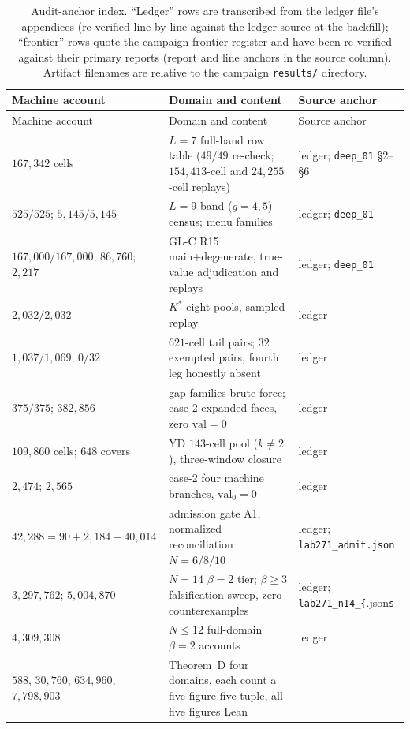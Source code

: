 \begin{longtable}{p{4.9cm} p{6.1cm} p{3.8cm}}
\caption{Audit-anchor index. ``Ledger'' rows are transcribed from the ledger file's
appendices (re-verified line-by-line against the ledger source at the backfill);
``frontier'' rows quote the campaign frontier register and have been re-verified
against their primary reports (report and line anchors in the source column). Artifact
filenames are relative to the campaign \texttt{results/} directory.}
\label{tab:anchorindex}\\
\hline
Machine account & Domain and content & Source anchor \\
\hline
\endfirsthead
\hline
Machine account & Domain and content & Source anchor \\
\hline
\endhead
$167{,}342$ cells & $L=7$ full-band row table ($49/49$ re-check; $154{,}413$-cell and
  $24{,}255$-cell replays) & ledger; \texttt{deep\_01} \S2--\S6 \\
$525/525$; $5{,}145/5{,}145$ & $L=9$ band ($g=4,5$) census; menu families &
  ledger; \texttt{deep\_01} \\
$167{,}000/167{,}000$; $86{,}760$; $2{,}217$ & GL-C R15 main+degenerate, true-value
  adjudication and replays & ledger; \texttt{deep\_01} \\
$2{,}032/2{,}032$ & $K^*$ eight pools, sampled replay & ledger \\
$1{,}037/1{,}069$; $0/32$ & $621$-cell tail pairs; $32$ exempted pairs, fourth leg
  honestly absent & ledger \\
$375/375$; $382{,}856$ & gap families brute force; case-2 expanded faces, zero
  $\mathrm{val}=0$ & ledger \\
$109{,}860$ cells; $648$ covers & YD $143$-cell pool ($k\ne2$), three-window closure &
  ledger \\
$2{,}474$; $2{,}565$ & case-2 four machine branches, $\mathrm{val}_0=0$ & ledger \\
$42{,}288=90+2{,}184+40{,}014$ & admission gate A1, normalized reconciliation
  $N=6/8/10$ & ledger; \texttt{lab271\_admit.json} \\
$3{,}297{,}762$; $5{,}004{,}870$ & $N=14$ $\beta=2$ tier; $\beta\ge3$ falsification
  sweep, zero counterexamples & ledger; \texttt{lab271\_n14\_\{}.json\texttt{s} \\
$4{,}309{,}308$ & $N\le12$ full-domain $\beta=2$ accounts & ledger \\
$588$, $30{,}760$, $634{,}960$, $7{,}798{,}903$ & Theorem~D four domains, each count a
  five-figure five-tuple, all five figures Lean

\end{longtable}
